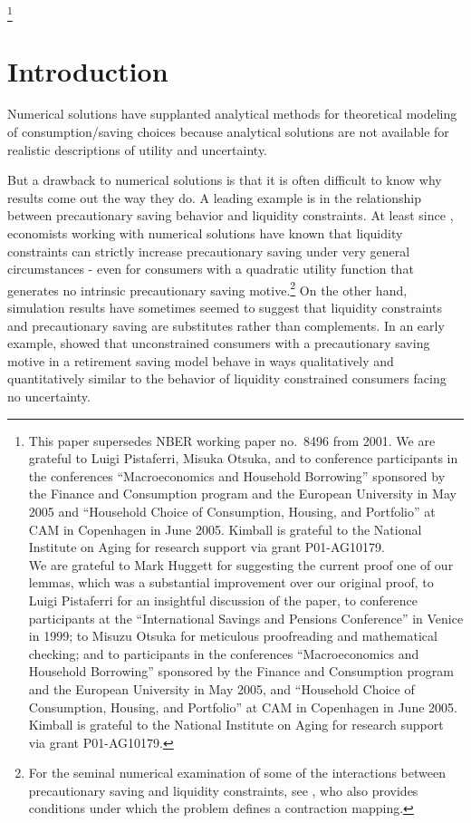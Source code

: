 \documentclass[titlepage]{\econtex}
\begin{document}
\thanks{This paper supersedes NBER working paper no.\ 8496 from 2001. We are grateful to Luigi Pistaferri, Misuka Otsuka, and to conference participants in the conferences ``Macroeconomics and Household Borrowing'' sponsored by the Finance and Consumption program and the European University in May 2005 and ``Household Choice of Consumption, Housing, and Portfolio'' at CAM in Copenhagen in June 2005. Kimball is grateful to the National Institute on Aging for research support via grant P01-AG10179.
  \\ 
We are grateful to Mark Huggett for suggesting the current proof one of our lemmas, which was a substantial improvement over our original proof, to Luigi Pistaferri for an insightful discussion of the paper, to conference participants at the ``International Savings and Pensions Conference'' in Venice in 1999; to Misuzu Otsuka for meticulous proofreading and mathematical checking; and to participants in the conferences ``Macroeconomics and Household Borrowing'' sponsored by the Finance and Consumption program and the European University in May 2005, and ``Household Choice of Consumption, Housing, and Portfolio'' at CAM in Copenhagen in June 2005.  Kimball is grateful to the National Institute on Aging for research support via grant P01-AG10179.}

\titlepagefinish
\setcounter{page}{1}

\setcounter{footnote}{0}


\hypertarget{Introduction}{}
\section{Introduction}\label{sec:Intro}


Numerical solutions have supplanted analytical methods for theoretical modeling of consumption/saving choices because analytical solutions are not available for realistic descriptions of utility and uncertainty.

But a drawback to numerical solutions is that it is often difficult to know why results come out the way they do.  A leading example is in the relationship between precautionary saving behavior and liquidity constraints.  At least since \citet{zeldes:thesis}, economists working with numerical solutions have known that liquidity constraints can strictly increase precautionary saving under very general circumstances - even for consumers with a quadratic utility function that generates no intrinsic precautionary saving motive.\footnote{For the seminal numerical examination of some of the interactions between precautionary saving and liquidity constraints, see \citet{deatonLiqConstr}, who also provides conditions under which the problem defines a contraction mapping.} On the other hand, simulation results have sometimes seemed to suggest that liquidity constraints and precautionary saving are substitutes rather than complements.  In an early example, \citet{samwick:pensions} showed that unconstrained consumers with a precautionary saving motive in a retirement saving model behave in ways qualitatively and quantitatively similar to the behavior of liquidity constrained consumers facing no uncertainty.
\end{document}
